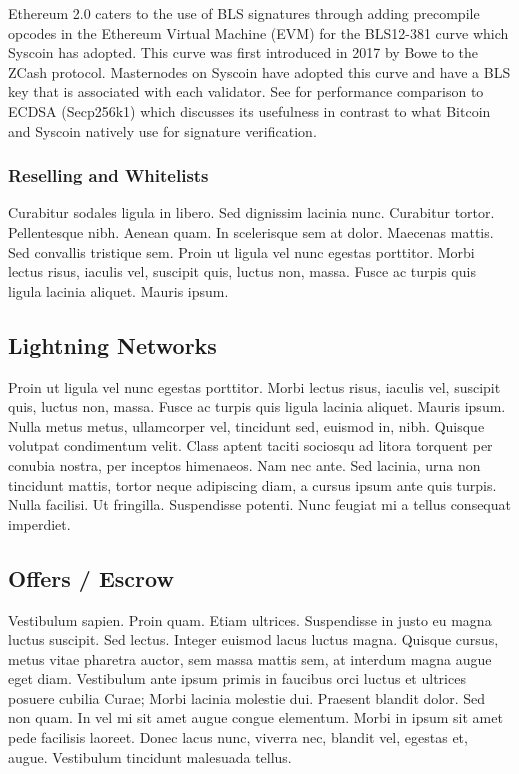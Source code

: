 \documentclass[peerreview]{ieeesyscoin}
\begin{document}
Ethereum 2.0 caters to the use of BLS signatures through adding precompile opcodes in the Ethereum Virtual Machine (EVM) for the BLS12-381 curve \cite{Dra18} which Syscoin has adopted. This curve was first introduced in 2017 by Bowe \cite{Bow17}  to the ZCash protocol. Masternodes on Syscoin have adopted this curve and have a BLS key that is associated with each validator. See \cite{Blo18} for performance comparison to ECDSA (Secp256k1) which discusses its usefulness in contrast to what Bitcoin and Syscoin natively use for signature verification.

\subsubsection{Reselling and Whitelists}

Curabitur sodales ligula in libero. Sed dignissim lacinia nunc. Curabitur tortor. Pellentesque nibh. Aenean quam. In scelerisque sem at dolor. Maecenas mattis. Sed convallis tristique sem. Proin ut ligula vel nunc egestas porttitor. Morbi lectus risus, iaculis vel, suscipit quis, luctus non, massa. Fusce ac turpis quis ligula lacinia aliquet. Mauris ipsum. 

\subsection{Lightning Networks}
Proin ut ligula vel nunc egestas porttitor. Morbi lectus risus, iaculis vel, suscipit quis, luctus non, massa. Fusce ac turpis quis ligula lacinia aliquet. Mauris ipsum. Nulla metus metus, ullamcorper vel, tincidunt sed, euismod in, nibh. Quisque volutpat condimentum velit. Class aptent taciti sociosqu ad litora torquent per conubia nostra, per inceptos himenaeos. Nam nec ante. Sed lacinia, urna non tincidunt mattis, tortor neque adipiscing diam, a cursus ipsum ante quis turpis. Nulla facilisi. Ut fringilla. Suspendisse potenti. Nunc feugiat mi a tellus consequat imperdiet. 

\subsection{Offers / Escrow}
Vestibulum sapien. Proin quam. Etiam ultrices. Suspendisse in justo eu magna luctus suscipit. Sed lectus. Integer euismod lacus luctus magna. Quisque cursus, metus vitae pharetra auctor, sem massa mattis sem, at interdum magna augue eget diam. Vestibulum ante ipsum primis in faucibus orci luctus et ultrices posuere cubilia Curae; Morbi lacinia molestie dui. Praesent blandit dolor. Sed non quam. In vel mi sit amet augue congue elementum. Morbi in ipsum sit amet pede facilisis laoreet. Donec lacus nunc, viverra nec, blandit vel, egestas et, augue. Vestibulum tincidunt malesuada tellus. 
\end{document}
